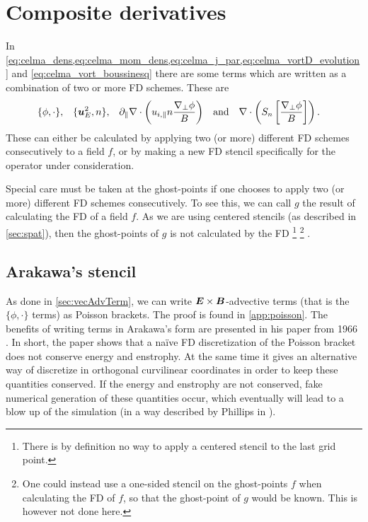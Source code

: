 \section{Composite derivatives}
\label{sec:compDeriv}
%
In \cref{eq:celma_dens,eq:celma_mom_dens,eq:celma_j_par,eq:celma_vortD_evolution} and \cref{eq:celma_vort_boussinesq} there are some terms which are written as a combination of two or more FD schemes.
These are
%
\begin{align*}
    &\{\phi,\cdot\},&
    &\{\boldsymbol{u}_E^2,n\},&
    &\partial_\|\nabla\cdot \left( u_{i,\|}n \frac{\nabla_\perp \phi}{B}\right)&
    &\text{and}&
    &\nabla\cdot \left( S_n \left[ \frac{ \nabla_\perp \phi }{ B } \right] \right).&
\end{align*}
%
These can either be calculated by applying two (or more) different FD schemes consecutively to a field $f$, or by making a new FD stencil specifically for the operator under consideration.

Special care must be taken at the ghost-points if one chooses to apply two (or more) different FD schemes consecutively.
To see this, we can call $g$ the result of calculating the FD of a field $f$.
As we are using centered stencils (as described in \cref{sec:spat}), then the ghost-points of $g$ is not calculated by the FD%
%
\footnote{There is by definition no way to apply a centered stencil to the last grid point.}%
%
\footnote{One could instead use a one-sided stencil on the ghost-points $f$ when calculating the FD of $f$, so that the ghost-point of $g$ would be known.
This is however not done here.}
%
.

\subsection{Arakawa's stencil}
%
As done in \cref{sec:vecAdvTerm}, we can write $\boldsymbol{E}\times\boldsymbol{B}$-advective terms (that is the $\{\phi,\cdot\}$ terms) as Poisson brackets.
The proof is found in \cref{app:poisson}.
The benefits of writing terms in Arakawa's form are presented in his paper from 1966 \cite{Arakwa1966}.
In short, the paper shows that a na\"ive FD discretization of the Poisson bracket does not conserve energy and enstrophy.
At the same time it gives an alternative way of discretize in orthogonal curvilinear coordinates in order to keep these quantities conserved.
If the energy and enstrophy are not conserved, fake numerical generation of these quantities occur, which eventually will lead to a blow up of the simulation (in a way described by Phillips in \cite{Phillips1959}).

